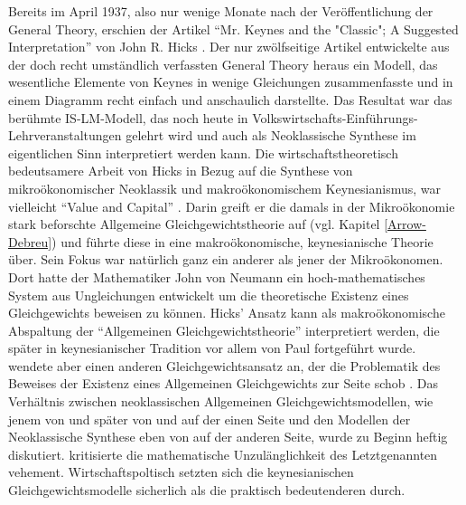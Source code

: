 Bereits im April 1937, also nur wenige Monate nach der Veröffentlichung der General Theory, erschien der  Artikel "`Mr. Keynes and the "Classic"; A Suggested Interpretation"' von John R. Hicks \parencite{Hicks1937}. Der nur zwölfseitige Artikel entwickelte aus der doch recht umständlich verfassten General Theory heraus ein Modell, das wesentliche Elemente von Keynes in wenige Gleichungen zusammenfasste und in einem Diagramm recht einfach und anschaulich darstellte. Das Resultat war das berühmte IS-LM-Modell, das noch heute in Volkswirtschafts-Einführungs-Lehrveranstaltungen gelehrt wird und auch als Neoklassische Synthese im eigentlichen Sinn interpretiert werden kann. Die wirtschaftstheoretisch bedeutsamere Arbeit von Hicks in Bezug auf die Synthese von mikroökonomischer Neoklassik und makroökonomischem Keynesianismus, war vielleicht "`Value and Capital"' \parencite{Hicks1939}. Darin greift er die damals in der Mikroökonomie stark beforschte Allgemeine Gleichgewichtstheorie auf (vgl. Kapitel \ref{Arrow-Debreu}) und führte diese in eine makroökonomische, keynesianische Theorie über. Sein Fokus war natürlich ganz ein anderer als jener der Mikroökonomen. Dort hatte der Mathematiker John von Neumann ein hoch-mathematisches System aus Ungleichungen entwickelt um die theoretische Existenz eines Gleichgewichts beweisen zu können. Hicks' Ansatz kann als makroökonomische Abspaltung der "`Allgemeinen Gleichgewichtstheorie"' interpretiert werden, die später in keynesianischer Tradition vor allem von Paul \textcite{Samuelson1947} fortgeführt wurde. \textcite{Hicks1939} wendete aber einen anderen Gleichgewichtsansatz an, der die Problematik des Beweises der Existenz eines Allgemeinen Gleichgewichts zur Seite schob \parencite[S. 21]{Weintraub1983}. Das Verhältnis zwischen neoklassischen Allgemeinen Gleichgewichtsmodellen, wie jenem von \textcite{Neumann1937} und später von \textcite{Arrow1954} und \textcite{McKenzie1954} auf der einen Seite und den Modellen der Neoklassische Synthese eben von \textcite{Hicks1939} auf der anderen Seite, wurde zu Beginn heftig diskutiert. \textcite{Morgenstern1941} kritisierte die mathematische Unzulänglichkeit des Letztgenannten vehement. Wirtschaftspoltisch setzten sich die keynesianischen Gleichgewichtsmodelle sicherlich als die praktisch bedeutenderen durch. 

